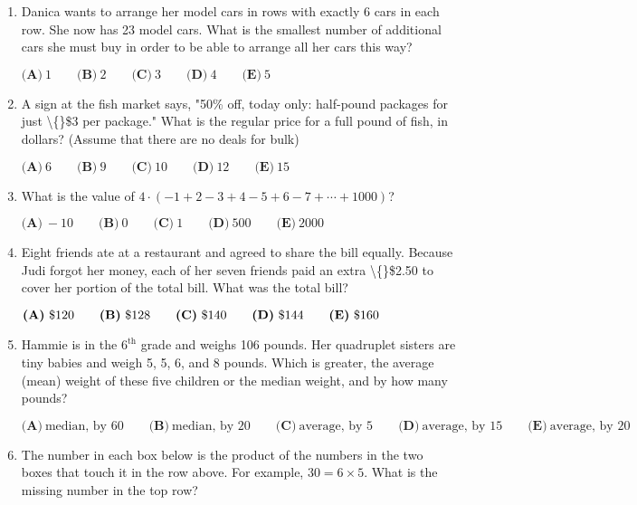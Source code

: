 \documentclass{article}
\begin{document}
\begin{enumerate}[label=\arabic*., itemsep=0.5em]\item Danica wants to arrange her model cars in rows with exactly 6 cars in each row. She now has 23 model cars. What is the smallest number of additional cars she must buy in order to be able to arrange all her cars this way?

\(\textbf{(A)}\ 1 \qquad \textbf{(B)}\ 2 \qquad \textbf{(C)}\ 3 \qquad \textbf{(D)}\ 4 \qquad \textbf{(E)}\ 5\)\par \vspace{0.5em}\item A sign at the fish market says, "50\% off, today only: half-pound packages for just \textbackslash\{\}\$3 per package." What is the regular price for a full pound of fish, in dollars? (Assume that there are no deals for bulk)

\(\textbf{(A)}\ 6 \qquad \textbf{(B)}\ 9 \qquad \textbf{(C)}\ 10 \qquad \textbf{(D)}\ 12 \qquad \textbf{(E)}\ 15\)\par \vspace{0.5em}\item What is the value of \(4 \cdot (-1+2-3+4-5+6-7+\cdots+1000)\)?

\(\textbf{(A)}\ -10 \qquad \textbf{(B)}\ 0 \qquad \textbf{(C)}\ 1 \qquad \textbf{(D)}\ 500 \qquad \textbf{(E)}\ 2000\)\par \vspace{0.5em}\item Eight friends ate at a restaurant and agreed to share the bill equally. Because Judi forgot her money, each of her seven friends paid an extra \textbackslash\{\}\$2.50 to cover her portion of the total bill. What was the total bill?

\( \textbf{(A)}\ \text{\textdollar}120\qquad\textbf{(B)}\ \text{\textdollar}128\qquad\textbf{(C)}\ \text{\textdollar}140\qquad\textbf{(D)}\ \text{\textdollar}144\qquad\textbf{(E)}\ \text{\textdollar}160 \)\par \vspace{0.5em}\item Hammie is in the \(6^\text{th}\) grade and weighs 106 pounds. Her quadruplet sisters are tiny babies and weigh 5, 5, 6, and 8 pounds. Which is greater, the average (mean) weight of these five children or the median weight, and by how many pounds?

\(\textbf{(A)}\ \text{median, by 60} \qquad \textbf{(B)}\ \text{median, by 20} \qquad \textbf{(C)}\ \text{average, by 5} \qquad \textbf{(D)}\ \text{average, by 15} \qquad \textbf{(E)}\ \text{average, by 20}\)\par \vspace{0.5em}\item The number in each box below is the product of the numbers in the two boxes that touch it in the row above. For example, \(30 = 6\times5\). What is the missing number in the top row?



\end{enumerate}
\end{document}
